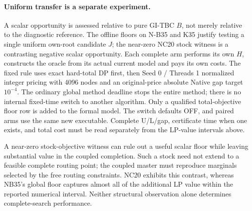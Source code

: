 \paragraph{Uniform transfer is a separate experiment.}
A scalar opportunity is assessed relative to pure GI-TBC $B$, not merely
relative to the diagnostic reference. The offline floors on N-B35 and K35
justify testing a single uniform own-root candidate $J$; the near-zero NC20
stock witness is a contrasting negative scalar opportunity. Each complete
arm performs its own $H$, constructs the oracle from its actual current
model and pays its own costs. The fixed rule uses exact hard-total DP first,
then Seed 0 / Threads 1 normalized integer pricing with 4096 nodes and an
original-price absolute Native gap target $10^{-4}$. The ordinary global
method deadline stops the entire method; there is no internal fixed-time
switch to another algorithm. Only a qualified total-objective floor row is
added to the formal model. The switch defaults OFF, and paired arms use the
same new executable. Complete U/L/gap, certificate time when one exists,
and total cost must be read separately from the LP-value intervals above.

A near-zero stock-objective witness can rule out a useful scalar floor
while leaving substantial value in the coupled completion. Such a stock
need not extend to a feasible complete routing point; the coupled master
must reproduce marginals selected by the free routing constraints. NC20
exhibits this contrast, whereas NB35's global floor captures almost all
of the additional LP value within the reported numerical interval.
Neither structural observation alone determines complete-search performance.

